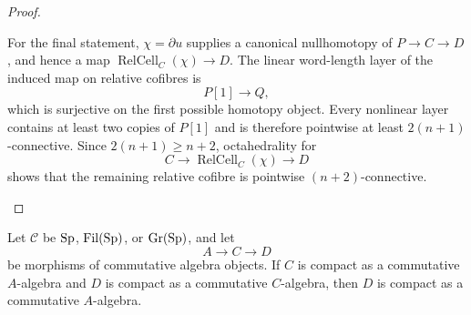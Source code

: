 \begin{proof}
\begin{enumerate}[label=\textup{(\arabic*)}]
    For the final statement, \(\chi=\partial u\) supplies a canonical
    nullhomotopy of \(P\to C\to D\), and hence a map
    \(\operatorname{RelCell}_C(\chi)\to D\). The
    linear word-length layer of the induced map on relative cofibres is
    \[
        P[1]\longrightarrow Q,
    \]
    which is surjective on the first possible homotopy object. Every nonlinear
    layer contains at least two copies of \(P[1]\) and is therefore pointwise at
    least \(2(n+1)\)-connective. Since \(2(n+1)\geq n+2\), octahedrality for
    \[
        C\longrightarrow \operatorname{RelCell}_C(\chi)\longrightarrow D
    \]
    shows that the remaining relative cofibre is pointwise
    \((n+2)\)-connective.
\end{enumerate}
\end{proof}



\begin{lemma}
\label{lem:compact-algebra-morphism-composition}
Let \(\mathcal C\) be \(\operatorname{Sp}\), \(\operatorname{Fil}(\operatorname{Sp})\), or
\(\operatorname{Gr}(\operatorname{Sp})\), and let
\[
    A\longrightarrow C\longrightarrow D
\]
be morphisms of commutative algebra objects. If \(C\) is compact as a
commutative \(A\)-algebra and \(D\) is compact as a commutative
\(C\)-algebra, then \(D\) is compact as a commutative \(A\)-algebra.
\end{lemma}

